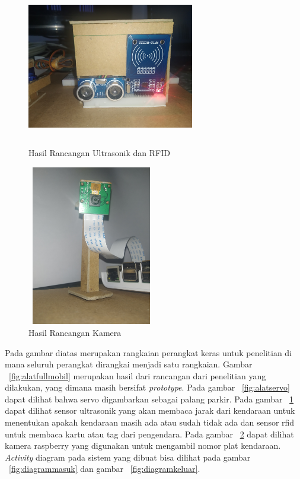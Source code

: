 \begin{figure} [H]
    \includegraphics[height=7cm, width=0.65\textwidth, center]{images/alat-ultra&rfid.jpg}
    \caption{Hasil Rancangan Ultrasonik dan RFID}
    \label{fig:alatultrarfid}
\end{figure}

\begin{figure} [H]
    \includegraphics[height=7cm, width=0.5\textwidth, center]{images/alat-kamera.jpg}
    \caption{Hasil Rancangan Kamera}
    \label{fig:alatkamera}
\end{figure}

Pada gambar diatas merupakan rangkaian perangkat keras untuk penelitian di mana seluruh perangkat dirangkai menjadi satu rangkaian.  Gambar ~\ref{fig:alatfullmobil} merupakan hasil dari rancangan dari penelitian yang dilakukan, yang dimana masih bersifat \textit{prototype}. Pada gambar ~\ref{fig:alatservo} dapat dilihat bahwa servo digambarkan sebagai palang parkir. Pada gambar ~\ref{fig:alatultrarfid} dapat dilihat sensor ultrasonik yang akan membaca jarak dari kendaraan untuk menentukan apakah kendaraan masih ada atau sudah tidak ada dan sensor rfid untuk membaca kartu atau tag dari pengendara. Pada gambar ~\ref{fig:alatkamera} dapat dilihat kamera raspberry yang digunakan untuk mengambil nomor plat kendaraan. \textit{Activity} diagram pada sistem yang dibuat bisa dilihat pada gambar ~\ref{fig:diagrammasuk} dan gambar ~\ref{fig:diagramkeluar}.\newline

